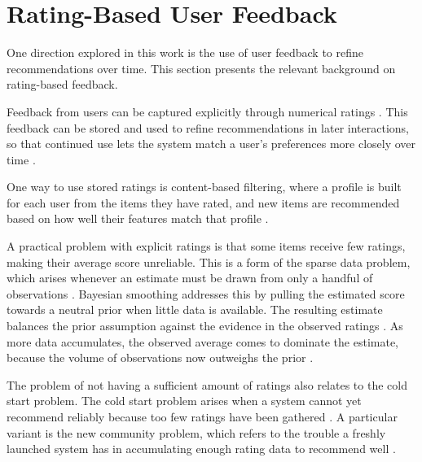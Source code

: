 \section{Rating-Based User Feedback}
\label{sec:rating-based-user-feedback}
One direction explored in this work is the use of user feedback to
refine recommendations over time. This section presents the relevant
background on rating-based feedback.

Feedback from users can be captured explicitly through numerical ratings
\parencite[Chapter~3.1]{bobadilla2013recommender_systems_survey}. 
This feedback can be stored and used to refine recommendations in
later interactions, so that continued use lets the system match a
user's preferences more closely over time
\parencite[Chapter~1]{ricci2010recommender_systems_handbook}.

One way to use stored ratings is content-based filtering, where a
profile is built for each user from the items they have rated, and
new items are recommended based on how well their features match that
profile \parencite[Chapter~4]{ricci2010recommender_systems_handbook}.

A practical problem with explicit ratings is that some items 
receive few ratings, making their average score unreliable. 
This is a form of the sparse data problem, which arises 
whenever an estimate must be drawn from only a handful of 
observations 
\parencite[Chapter~3.3]{murphy2012machine_learning_probabilistic_perspective}. 
Bayesian smoothing addresses this by pulling the estimated score 
towards a neutral prior when little data is available. 
The resulting estimate balances the prior assumption against 
the evidence in the observed ratings 
\parencite[Chapter~3.3]{murphy2012machine_learning_probabilistic_perspective}. 
As more data accumulates, the observed average comes to dominate 
the estimate, because the volume of observations now outweighs 
the prior 
\parencite[Chapter~3.3]{murphy2012machine_learning_probabilistic_perspective}.

The problem of not having a sufficient amount of ratings 
also relates to the cold start problem. 
The cold start problem arises when a system 
cannot yet recommend reliably because too few ratings have been 
gathered 
\parencite[Chapter~3.2]{bobadilla2013recommender_systems_survey}. 
A particular variant is the new community problem, which refers 
to the trouble a freshly launched system has in accumulating 
enough rating data to recommend well 
\parencite[Chapter~3.2]{bobadilla2013recommender_systems_survey}. 